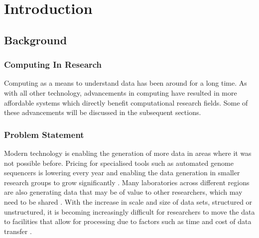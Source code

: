 
\chapter{Introduction} %

\label{Chapter1} %


\newcommand{\keyword}[1]{\textbf{#1}}
\newcommand{\tabhead}[1]{\textbf{#1}}
\newcommand{\code}[1]{\texttt{#1}}
\newcommand{\file}[1]{\texttt{\bfseries#1}}
\newcommand{\option}[1]{\texttt{\itshape#1}}


\section{Background}
\subsection{Computing In Research}
Computing as a means to understand data has been around for a long time. As with all other technology, advancements in computing have resulted in more affordable systems which directly benefit computational research fields. Some of these advancements will be discussed in the subsequent sections.


\subsection{Problem Statement}

Modern technology is enabling the generation of more data in areas where it was not possible before. Pricing for specialised tools such as automated genome sequencers is lowering every year and enabling the data generation in smaller research groups to grow significantly \parencite{jagadish2014big}. Many laboratories across different regions are also generating data that may be of value to other researchers, which may need to be shared \parencite{marx2013biology}. With the increase in scale and size of data sets, structured or unstructured, it is becoming increasingly difficult for researchers to move the data to facilities that allow for processing due to factors such as time and cost of data transfer \parencite{marx2013biology}.

